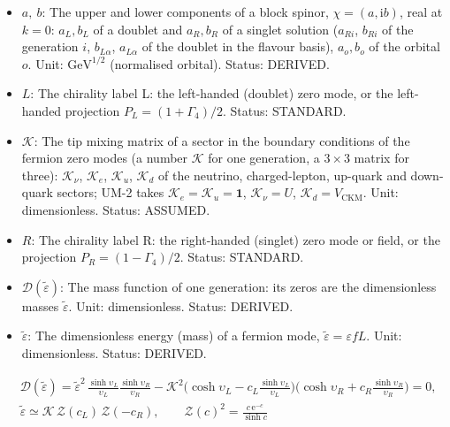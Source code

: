\documentclass[
  10pt,
]{article}
\providecommand{\tightlist}{%
  \setlength{\itemsep}{0pt}\setlength{\parskip}{0pt}}
\begin{document}
\begin{itemize}
\tightlist
\item
  \(a,\ b\): The upper and lower components of a block spinor,
  \(\chi = (a, \mathrm{i}b)\), real at \(k = 0\): \(a_L, b_L\) of a
  doublet and \(a_R, b_R\) of a singlet solution (\(a_{Ri}\), \(b_{Ri}\)
  of the generation \(i\), \(b_{L\alpha}\), \(a_{L\alpha}\) of the
  doublet in the flavour basis), \(a_o, b_o\) of the orbital \(o\).
  Unit: \(\mathrm{GeV}^{1/2}\) (normalised orbital). Status: DERIVED.
\item
  \(L\): The chirality label L: the left-handed (doublet) zero mode, or
  the left-handed projection \(P_L = (1 + \Gamma_4)/2\). Status:
  STANDARD.
\item
  \(\mathcal{K}\): The tip mixing matrix of a sector in the boundary
  conditions of the fermion zero modes (a number \(\mathcal{K}\) for one
  generation, a \(3 \times 3\) matrix for three): \(\mathcal{K}_\nu\),
  \(\mathcal{K}_e\), \(\mathcal{K}_u\), \(\mathcal{K}_d\) of the
  neutrino, charged-lepton, up-quark and down-quark sectors; UM-2 takes
  \(\mathcal{K}_e = \mathcal{K}_u = \mathbf{1}\),
  \(\mathcal{K}_\nu = U\), \(\mathcal{K}_d = V_{\mathrm{CKM}}\). Unit:
  dimensionless. Status: ASSUMED.
\item
  \(R\): The chirality label R: the right-handed (singlet) zero mode or
  field, or the projection \(P_R = (1 - \Gamma_4)/2\). Status: STANDARD.
\item
  \(\mathcal{D}(\tilde\varepsilon)\): The mass function of one
  generation: its zeros are the dimensionless masses
  \(\tilde\varepsilon\). Unit: dimensionless. Status: DERIVED.
\item
  \(\tilde\varepsilon\): The dimensionless energy (mass) of a fermion
  mode, \(\tilde\varepsilon = \varepsilon fL\). Unit: dimensionless.
  Status: DERIVED.
\end{itemize}

\[
\begin{aligned}
&\mathcal{D}(\tilde\varepsilon) =
 \tilde\varepsilon^2\,\frac{\sinh\upsilon_L}{\upsilon_L}\frac{\sinh\upsilon_R}{\upsilon_R}
 - \mathcal{K}^2\Big(\cosh\upsilon_L - c_L\frac{\sinh\upsilon_L}{\upsilon_L}\Big)
 \Big(\cosh\upsilon_R + c_R\frac{\sinh\upsilon_R}{\upsilon_R}\Big) = 0,\\
&\tilde\varepsilon \simeq \mathcal{K}\,\mathcal{Z}(c_L)\,\mathcal{Z}(-c_R),\qquad \mathcal{Z}(c)^2 =
 \frac{c\,\mathrm{e}^{-c}}{\sinh c}
\end{aligned} \tag{FE-59}
\]
\end{document}
